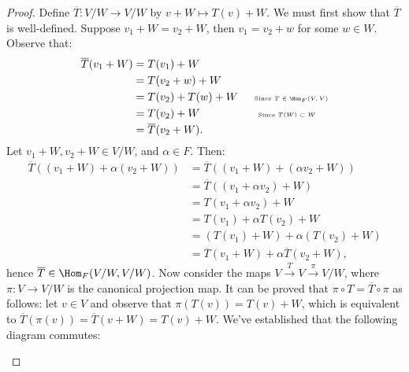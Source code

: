 \documentclass[9pt,twoside,openany]{memoir}
\theoremstyle{plain}
\theoremstyle{definition}
\theoremstyle{remark}
\numberwithin{equation}{section}
\begin{document}
        \begin{proof}
            Define $\overline{T}: V/W \rightarrow V/W$ by $v +W \mapsto T(v) + W$. We must first show that $\overline{T}$ is well-defined. Suppose $v_1 + W = v_2 + W$, then $v_1 = v_2 + w$ for some $w \in W$. Observe that:
                \begin{equation*}
                \begin{split}
                    \overline{T}(v_1 + W)
                    & = T(v_1) + W \\
                    & = T(v_2 + w) + W \\
                    & = T(v_2) + T(w) + W \hspace{15pt} \text{\tiny Since $T \in \Hom_F{(V,V)}$}\\
                    & = T(v_2) + W \hspace{53pt} \text{\tiny Since $T(W) \subset W$} \\
                    & = \overline{T}(v_2 + W).
                \end{split}
                \end{equation*}
            Let $v_1 + W , v_2 + W \in V/W$, and $\alpha \in F$. Then:
                \begin{equation*}
                \begin{split}
                    \overline{T}((v_1 + W) + \alpha(v_2 + W))
                    & = \overline{T}((v_1 + W) + (\alpha v_2 + W)) \\
                    & = \overline{T}((v_1 + \alpha v_2) + W) \\
                    & = T(v_1 + \alpha v_2) + W \\
                    & = T(v_1) + \alpha T(v_2) + W \\
                    & = (T(v_1) + W) + \alpha(T(v_2) + W) \\
                    & = \overline{T}(v_1 + W) + \alpha \overline{T}(v_2 + W),
                \end{split}
                \end{equation*}
            hence $\overline{T} \in \Hom_F{(V/W, V/W)}$. Now consider the maps $V \xrightarrow{T} V \xrightarrow{\pi} V/W$, where $\pi:V \rightarrow V/W$ is the canonical projection map. It can be proved that $\pi \circ T = \overline{T} \circ \pi$ as follows: let $v \in V$ and observe that $\pi(T(v)) = T(v) + W$, which is equivalent to $\overline{T}(\pi(v)) = \overline{T}(v + W) = T(v) + W$. We've established that the following diagram commutes:
            \begin{center}
            \end{center}
            

\end{proof}
\end{document}
